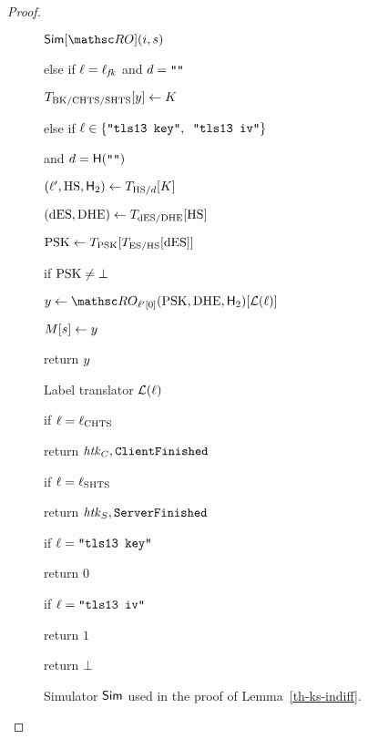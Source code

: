 \begin{proof}
\begin{figure}[tp]
\begin{minipage}[t]{0.54\textwidth}
\begin{oracle}{$\Sim[\RO](\simIndex,\simInString)$}
				\item else if $\ell = \ell_{\mathit{fk}}$ and $d = \texttt{""}$ 
				\item \quad $T_{\mathrm{BK}/\mathrm{CHTS}/\mathrm{SHTS}}[y] \gets K$
				
				\item else if $\ell \in \{\texttt{"tls13 key"}, \texttt{ "tls13 iv"} \}$
				\item \quad and $d = \mathsf{H}(\texttt{""})$
				\item \quad $(\ell', \mathrm{HS}, \mathsf{H}_2) \gets T_{\mathrm{HS}/d}[K]$
				\item \quad $(\mathrm{dES}, \mathrm{DHE}) \gets T_{\mathrm{dES}/\mathrm{DHE}}[\mathrm{HS}]$
				\item \quad $\mathrm{PSK} \gets T_{\mathrm{PSK}}[T_{\mathrm{ES}/\mathrm{HS}}[ \mathrm{dES}]]$
				\item \quad if $\mathrm{PSK} \neq \bot$ 
				\item \quad \quad $y \gets \RO_{\kdflbl'[0]}(\psk, \dhe, \hash_2)[	\lblT(\kdflbl)]$
				\item []
				
				\item $M[s] \gets y$
				\item return $y$
			\end{oracle}
			
			\ExptSepSpace	
			\begin{oracle}{Label translator $\mathcal{L}(\ell)$}
				\item if $\ell  = \ell_{\mathrm{CHTS}}$
				\item \quad return $\mathit{htk}_C, \mathtt{ClientFinished}$
				\item if $\ell  = \ell_{\mathrm{SHTS}}$
				\item \quad return $\mathit{htk}_S, \mathtt{ServerFinished}$
				\item if $\ell =\texttt{"tls13 key"}$
				\item \quad return $0$
				\item if $\ell =\texttt{"tls13 iv"}$ 
				\item \quad return $1$
				\item return $\bot$
			\end{oracle}
		\end{minipage}
		\label{fig-sim-ks-indiff}
		\caption{Simulator $\mathsf{Sim}$ used in the proof of Lemma~\ref{th-ks-indiff}.}
	\end{figure}
	

\end{proof}
